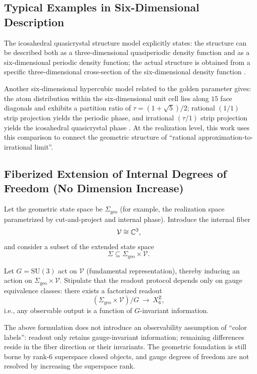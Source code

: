 \subsection{Typical Examples in Six-Dimensional Description}

The icosahedral quasicrystal structure model explicitly states: the structure can be described both as a three-dimensional quasiperiodic density function and as a six-dimensional periodic density function; the actual structure is obtained from a specific three-dimensional cross-section of the six-dimensional density function \cite{PRB43_929}.

Another six-dimensional hypercubic model related to the golden parameter gives: the atom distribution within the six-dimensional unit cell lies along $15$ face diagonals and exhibits a partition ratio of $\tau=(1+\sqrt5)/2$; rational $(1/1)$ strip projection yields the periodic phase, and irrational $(\tau/1)$ strip projection yields the icosahedral quasicrystal phase \cite{PRB46_6091}.
At the realization level, this work uses this comparison to connect the geometric structure of ``rational approximation-to-irrational limit''.

\subsection{Fiberized Extension of Internal Degrees of Freedom (No Dimension Increase)}
\begin{definition}\label{def:sigma-geo-times-V}
Let the geometric state space be $\Sigma_{\mathrm{geo}}$ (for example, the realization space parametrized by cut-and-project and internal phase). Introduce the internal fiber
$$
\mathcal{V}\cong \mathbb{C}^{3},
$$
and consider a subset of the extended state space
$$
\Sigma\subseteq \Sigma_{\mathrm{geo}}\times \mathcal{V}.
$$
\end{definition}\begin{definition}\label{def:gauge-quotient-readout}
Let $G=\mathrm{SU}(3)$ act on $\mathcal{V}$ (fundamental representation), thereby inducing an action on $\Sigma_{\mathrm{geo}}\times\mathcal{V}$. Stipulate that the readout protocol depends only on gauge equivalence classes: there exists a factorized readout
$$
(\Sigma_{\mathrm{geo}}\times\mathcal{V})/G \ \longrightarrow\ X_6^{\mathrm Z},
$$
i.e., any observable output is a function of $G$-invariant information.
\end{definition}\begin{remark}
The above formulation does not introduce an observability assumption of ``color labels'': readout only retains gauge-invariant information; remaining differences reside in the fiber direction or their invariants. The geometric foundation is still borne by rank-$6$ superspace closed objects, and gauge degrees of freedom are not resolved by increasing the superspace rank.
\end{remark}
